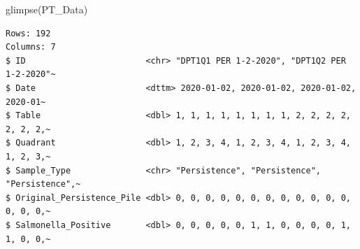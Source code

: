 \documentclass[
  letterpaper,
  DIV=11,
  numbers=noendperiod]{scrartcl}
\newenvironment{Shaded}{}{}
\newcommand{\AttributeTok}[1]{\textcolor[rgb]{0.84,0.23,0.29}{#1}}
\newcommand{\ConstantTok}[1]{\textcolor[rgb]{0.00,0.36,0.77}{#1}}
\newcommand{\DecValTok}[1]{\textcolor[rgb]{0.00,0.36,0.77}{#1}}
\newcommand{\FunctionTok}[1]{\textcolor[rgb]{0.44,0.26,0.76}{#1}}
\newcommand{\NormalTok}[1]{\textcolor[rgb]{0.14,0.16,0.18}{#1}}
\newcommand{\OtherTok}[1]{\textcolor[rgb]{0.44,0.26,0.76}{#1}}
\newcommand{\SpecialCharTok}[1]{\textcolor[rgb]{0.00,0.36,0.77}{#1}}
\newcommand{\StringTok}[1]{\textcolor[rgb]{0.01,0.18,0.38}{#1}}
\begin{document}
\begin{Shaded}
\begin{Highlighting}[]
\FunctionTok{glimpse}\NormalTok{(PT\_Data)}
\end{Highlighting}
\end{Shaded}

\begin{verbatim}
Rows: 192
Columns: 7
$ ID                        <chr> "DPT1Q1 PER 1-2-2020", "DPT1Q2 PER 1-2-2020"~
$ Date                      <dttm> 2020-01-02, 2020-01-02, 2020-01-02, 2020-01~
$ Table                     <dbl> 1, 1, 1, 1, 1, 1, 1, 1, 2, 2, 2, 2, 2, 2, 2,~
$ Quadrant                  <dbl> 1, 2, 3, 4, 1, 2, 3, 4, 1, 2, 3, 4, 1, 2, 3,~
$ Sample_Type               <chr> "Persistence", "Persistence", "Persistence",~
$ Original_Persistence_Pile <dbl> 0, 0, 0, 0, 0, 0, 0, 0, 0, 0, 0, 0, 0, 0, 0,~
$ Salmonella_Positive       <dbl> 0, 0, 0, 0, 0, 1, 1, 0, 0, 0, 0, 1, 1, 0, 0,~
\end{verbatim}

\begin{Shaded}
\end{Shaded}
\end{document}
